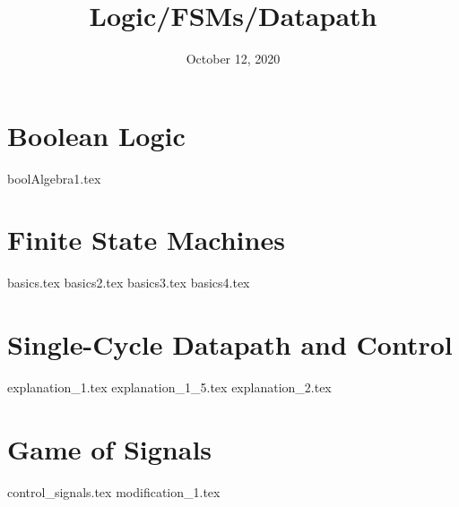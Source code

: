 \documentclass[11pt]{exam}
\title{Logic/FSMs/Datapath}
\date{October 12, 2020}
\begin{document}
\maketitle

\section{Boolean Logic}
\begin{questions}
{boolAlgebra1.tex}
\end{questions}
\newpage

\section{Finite State Machines}
\begin{questions}
{basics.tex}
{basics2.tex}
{basics3.tex}
{basics4.tex}
\end{questions}
\newpage

\section{Single-Cycle Datapath and Control}
\begin{questions}
{explanation_1.tex}
{explanation_1_5.tex}
{explanation_2.tex}
\end{questions}
\newpage

\section{Game of Signals}
\begin{questions}
{control_signals.tex}
{modification_1.tex}
\end{questions}
\newpage
\end{document}
